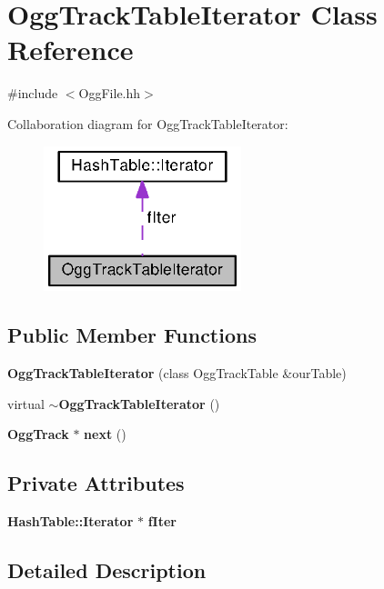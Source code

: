 \section{Ogg\+Track\+Table\+Iterator Class Reference}
\label{classOggTrackTableIterator}


{\ttfamily \#include $<$Ogg\+File.\+hh$>$}



Collaboration diagram for Ogg\+Track\+Table\+Iterator\+:
\nopagebreak
\begin{figure}[H]
\begin{center}
\leavevmode
\includegraphics[width=163pt]{classOggTrackTableIterator__coll__graph}
\end{center}
\end{figure}
\subsection*{Public Member Functions}
\begin{DoxyCompactItemize}
\item 
{\bf Ogg\+Track\+Table\+Iterator} (class Ogg\+Track\+Table \&our\+Table)
\item 
virtual {\bf $\sim$\+Ogg\+Track\+Table\+Iterator} ()
\item 
{\bf Ogg\+Track} $\ast$ {\bf next} ()
\end{DoxyCompactItemize}
\subsection*{Private Attributes}
\begin{DoxyCompactItemize}
\item 
{\bf Hash\+Table\+::\+Iterator} $\ast$ {\bf f\+Iter}
\end{DoxyCompactItemize}


\subsection{Detailed Description}



